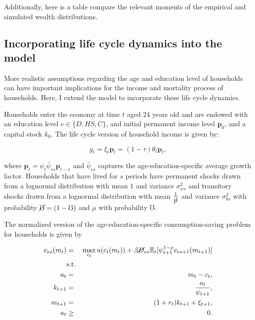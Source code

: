 \par Additionally, here is a table compare the relevant moments of the empirical and simulated wealth distributions.




\subsection{Incorporating life cycle dynamics into the model}

\par More realistic assumptions regarding the age and education level of households can have important implications for the income and mortality process of households. Here, I extend the model to incorporate these life cycle dynamics.

\par Households enter the economy at time $t$ aged 24 years old and are endowed with an education level $e \in \{D,HS,C\}$, and initial permanent income level $\textbf{p}_0$, and a capital stock $k_0$. The life cycle version of household income is given by:

$$ y_t = \xi_t \textbf{p}_t = (1 - \tau) \theta_t \textbf{p}_t, $$

where $\textbf{p}_t = \psi_t \bar{\psi}_{es} \textbf{p}_{t-1}$ and $\bar{\psi}_{es}$ captures the age-education-specific average growth factor. Households that have lived for $s$ periods have permanent shocks drawn from a lognormal distribution with mean $1$ and variance $\sigma^{2}_{\psi s}$ and transitory shocks drawn from a lognormal distribution with mean $\frac{1}{\cancel{\mho}}$ and variance $\sigma^{2}_{\theta s}$ with probability $\cancel{\mho} = (1-\mho)$ and $\mu$ with probability $\mho$.

\par The normalized version of the age-education-specific consumption-saving problem for households is given by

\begin{eqnarray*}
  v_{es}(m_t) &=& \max_{c_t} u(c_t(m_t)) + \beta \cancel{D}_{es} \mathbb{E}_{t}[\psi_{t+1}^{1-\rho}v_{es + 1}(m_{t+1})] \\
  &\text{s.t.}& \\
  a_t &=& m_t - c_t, \\
  k_{t+1} &=& \frac{a_t}{\psi_{t+1}}, \\
  m_{t+1} &=& (1 + r_t)k_{t+1} + \xi_{t+1}, \\
  a_t &\geq& 0.
\end{eqnarray*}

